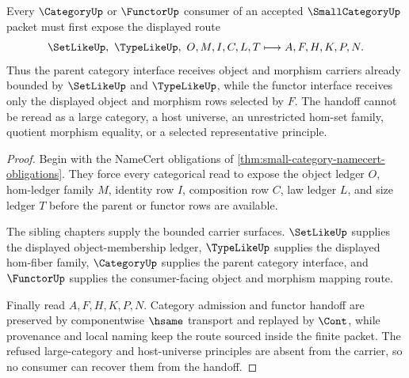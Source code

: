 \begin{theorem}
\label{thm:small-category-category-handoff}
Every $\CategoryUp$ or $\FunctorUp$ consumer of an accepted $\SmallCategoryUp$ packet must first expose the displayed route
$$
\SetLikeUp,\ \TypeLikeUp,\ O,M,I,C,L,T \longmapsto A,F,H,K,P,N .
$$
Thus the parent category interface receives object and morphism carriers already bounded by $\SetLikeUp$ and $\TypeLikeUp$, while the functor interface receives only the displayed object and morphism rows selected by $F$. The handoff cannot be reread as a large category, a host universe, an unrestricted hom-set family, quotient morphism equality, or a selected representative principle.
\end{theorem}
\begin{proof}
Begin with the NameCert obligations of \autoref{thm:small-category-namecert-obligations}. They force every categorical read to expose the object ledger $O$, hom-ledger family $M$, identity row $I$, composition row $C$, law ledger $L$, and size ledger $T$ before the parent or functor rows are available.

The sibling chapters supply the bounded carrier surfaces. $\SetLikeUp$ supplies the displayed object-membership ledger, $\TypeLikeUp$ supplies the displayed hom-fiber family, $\CategoryUp$ supplies the parent category interface, and $\FunctorUp$ supplies the consumer-facing object and morphism mapping route.

Finally read $A,F,H,K,P,N$. Category admission and functor handoff are preserved by componentwise $\hsame$ transport and replayed by $\Cont$, while provenance and local naming keep the route sourced inside the finite packet. The refused large-category and host-universe principles are absent from the carrier, so no consumer can recover them from the handoff.
\end{proof}




